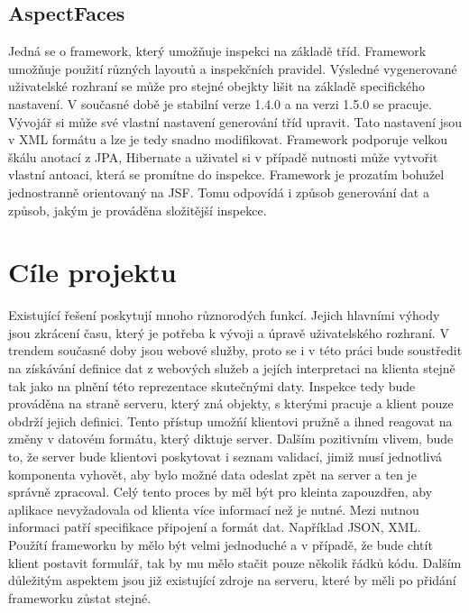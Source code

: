\subsection{AspectFaces}
Jedná se o framework, který umožňuje inspekci na základě tříd. Framework umožňuje použití různých layoutů a inspekčních pravidel. Výsledné vygenerované uživatelské rozhraní se může pro stejné obejkty lišit na základě specifického nastavení. V současné době je stabilní verze 1.4.0 a na verzi 1.5.0 se pracuje. Vývojář si může své vlastní nastavení generování tříd upravit. Tato nastavení jsou v XML formátu a lze je tedy snadno modifikovat. Framework podporuje velkou škálu anotací z JPA, Hibernate a uživatel si v případě nutnosti může vytvořit vlastní antoaci, která se promítne do inspekce. Framework je prozatím bohužel jednostranně orientovaný na JSF. Tomu odpovídá i způsob generování dat a způsob, jakým je prováděna složitější inspekce. 
\section{Cíle projektu}
Existující řešení poskytují mnoho různorodých funkcí. Jejich hlavními výhody jsou zkrácení času, který je potřeba k vývoji a úpravě uživatelského rozhraní. V trendem současné doby jsou webové služby, proto se i v této práci bude soustředit na získávání definice dat z webových služeb a jejích interpretaci na klienta stejně tak jako na plnění této reprezentace skutečnými daty. Inspekce tedy bude prováděna na straně serveru, který zná objekty, s kterými pracuje a klient pouze obdrží jejich definici. Tento přístup umožńí klientovi pružně a ihned reagovat na změny v datovém formátu, který diktuje server. Dalším pozitivním vlivem, bude to, že server bude klientovi poskytovat i seznam validací, jimiž musí jednotlivá komponenta vyhovět, aby bylo možné data odeslat zpět na server a ten je správně zpracoval. Celý tento proces by měl být pro kleinta zapouzdřen, aby aplikace nevyžadovala od klienta více informací než je nutné. Mezi nutnou informaci patří specifikace připojení a formát dat. Například JSON, XML. Použítí frameworku by mělo být velmi jednoduché a v případě, že bude chtít klient postavit formulář, tak by mu mělo stačit pouze několik řádků kódu. Dalším důležitým aspektem jsou již existující zdroje na serveru, které by měli po přidání frameworku zůstat stejné.   
 